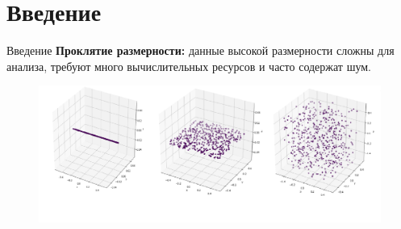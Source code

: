 \section{Введение}
\begin{frame}{Введение}
    \textbf{Проклятие размерности:} данные высокой размерности сложны для анализа, требуют много вычислительных ресурсов и часто содержат шум.

    \begin{figure}
        \includegraphics[width=.7 \textwidth]{../resources/intro/dim_curse.png}
    \end{figure}
\end{frame}
